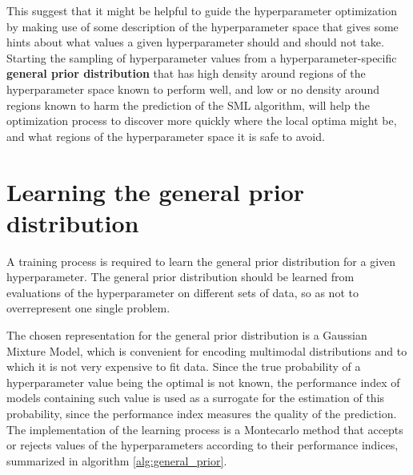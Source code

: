	This suggest that it might be helpful to guide the hyperparameter optimization by making use of
	some description of the hyperparameter space that gives some hints about what values a given
	hyperparameter should and should not take. Starting the sampling of hyperparameter values from a
	hyperparameter-specific {\bf general prior distribution} that has high density around regions of
	the hyperparameter space known to perform well, and low or no density around regions known to
	harm the prediction of the SML algorithm, will help the optimization process to discover more
	quickly where the local optima might be, and what regions of the hyperparameter space it is safe
	to avoid.

	\section{Learning the general prior distribution}
	A training process is required to learn the general prior distribution for a given
	hyperparameter. The general prior distribution should be learned from evaluations of the
	hyperparameter on different sets of data, so as not to overrepresent one single problem.

	The chosen representation for the general prior distribution is a Gaussian Mixture Model, which
	is convenient for encoding multimodal distributions and to which it is not very expensive to fit
	data. Since the true probability of a hyperparameter value being the optimal is not known, the
	performance index of models containing such value is used as a surrogate for the estimation of
	this probability, since the performance index measures the quality of the prediction. 
	The implementation of the learning process is a Montecarlo method that accepts or rejects
	values of the hyperparameters according to their performance indices, summarized in algorithm
	\ref{alg:general_prior}.

